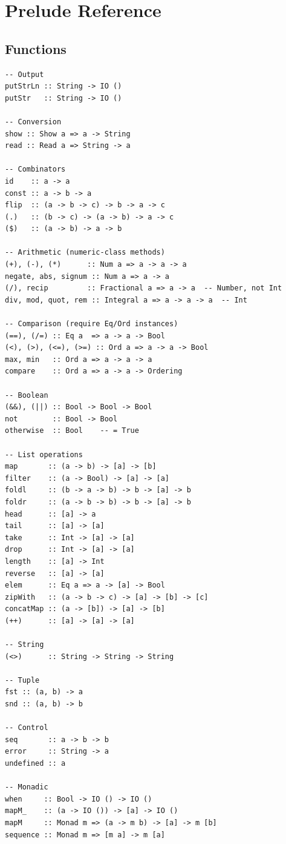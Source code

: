 \documentclass[11pt,a4paper]{article}
\begin{document}
\section{Prelude Reference}

\subsection{Functions}

\begin{lstlisting}
-- Output
putStrLn :: String -> IO ()
putStr   :: String -> IO ()

-- Conversion
show :: Show a => a -> String
read :: Read a => String -> a

-- Combinators
id    :: a -> a
const :: a -> b -> a
flip  :: (a -> b -> c) -> b -> a -> c
(.)   :: (b -> c) -> (a -> b) -> a -> c
($)   :: (a -> b) -> a -> b

-- Arithmetic (numeric-class methods)
(+), (-), (*)      :: Num a => a -> a -> a
negate, abs, signum :: Num a => a -> a
(/), recip         :: Fractional a => a -> a  -- Number, not Int
div, mod, quot, rem :: Integral a => a -> a -> a  -- Int

-- Comparison (require Eq/Ord instances)
(==), (/=) :: Eq a  => a -> a -> Bool
(<), (>), (<=), (>=) :: Ord a => a -> a -> Bool
max, min   :: Ord a => a -> a -> a
compare    :: Ord a => a -> a -> Ordering

-- Boolean
(&&), (||) :: Bool -> Bool -> Bool
not        :: Bool -> Bool
otherwise  :: Bool    -- = True

-- List operations
map       :: (a -> b) -> [a] -> [b]
filter    :: (a -> Bool) -> [a] -> [a]
foldl     :: (b -> a -> b) -> b -> [a] -> b
foldr     :: (a -> b -> b) -> b -> [a] -> b
head      :: [a] -> a
tail      :: [a] -> [a]
take      :: Int -> [a] -> [a]
drop      :: Int -> [a] -> [a]
length    :: [a] -> Int
reverse   :: [a] -> [a]
elem      :: Eq a => a -> [a] -> Bool
zipWith   :: (a -> b -> c) -> [a] -> [b] -> [c]
concatMap :: (a -> [b]) -> [a] -> [b]
(++)      :: [a] -> [a] -> [a]

-- String
(<>)      :: String -> String -> String

-- Tuple
fst :: (a, b) -> a
snd :: (a, b) -> b

-- Control
seq       :: a -> b -> b
error     :: String -> a
undefined :: a

-- Monadic
when     :: Bool -> IO () -> IO ()
mapM_    :: (a -> IO ()) -> [a] -> IO ()
mapM     :: Monad m => (a -> m b) -> [a] -> m [b]
sequence :: Monad m => [m a] -> m [a]
\end{lstlisting}
\end{document}
